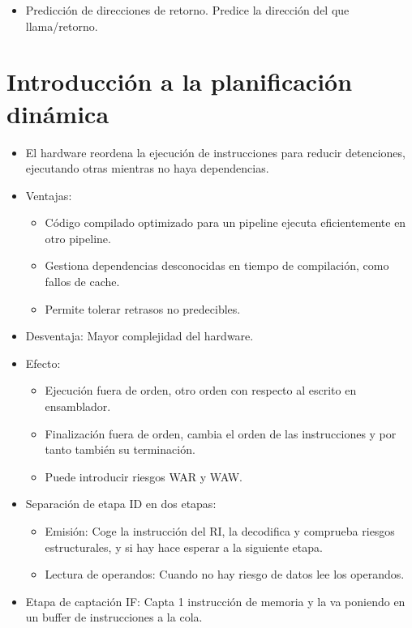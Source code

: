 \documentclass[12pt, twoside, openright]{report} %
\begin{document}
\begin{itemize}
\begin{itemize}
\begin{itemize}
        \item Predicción de direcciones de retorno. Predice la dirección del
          que llama/retorno.
      \end{itemize}
    \end{itemize}
  \end{itemize}
  \section{Introducción a la planificación dinámica}

  \begin{itemize}
  
  \item
    El hardware reordena la ejecución de instrucciones para reducir
    detenciones, ejecutando otras mientras no haya dependencias.
  \item
    Ventajas:

    \begin{itemize}
    
    \item
      Código compilado optimizado para un pipeline ejecuta
      eficientemente en otro pipeline.
    \item
      Gestiona dependencias desconocidas en tiempo de compilación, como
      fallos de cache.
    \item
      Permite tolerar retrasos no predecibles.
    \end{itemize}
  \item
    Desventaja: Mayor complejidad del hardware.
  \item
    Efecto:

    \begin{itemize}
    
    \item
      Ejecución fuera de orden, otro orden con respecto al escrito en
      ensamblador.
    \item
      Finalización fuera de orden, cambia el orden de las instrucciones
      y por tanto también su terminación.
    \item
      Puede introducir riesgos WAR y WAW.
    \end{itemize}
  \item
    Separación de etapa ID en dos etapas:

    \begin{itemize}
    
    \item
      Emisión: Coge la instrucción del RI, la decodifica y comprueba
      riesgos estructurales, y si hay hace esperar a la siguiente etapa.
    \item
      Lectura de operandos: Cuando no hay riesgo de datos lee los
      operandos.
    \end{itemize}
  \item
    Etapa de captación IF: Capta 1 instrucción de memoria y la va
    poniendo en un buffer de instrucciones a la cola.


\end{itemize}
\end{document}
